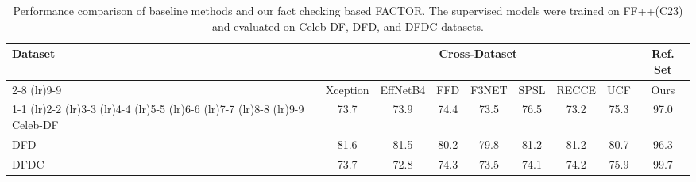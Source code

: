 \documentclass{article} \usepackage{iclr2024_conference,times}
\begin{document}
\begin{table}[t]
\caption{Performance comparison of baseline methods and our fact checking based FACTOR. The supervised models were trained on FF++(C23) and evaluated on Celeb-DF, DFD, and DFDC datasets.}
\vspace{-0.75em}
\label{tab:cross_vs_ref}
\begin{center}
\begin{tabular}{lccccccc|c}
\toprule
\multirow{3}{*}{Dataset} & \multicolumn{7}{c|}{Cross-Dataset} & Ref. Set \\
\cmidrule(lr){2-8} \cmidrule(lr){9-9}
& Xception & EffNetB4 & FFD & F3NET & SPSL & 
 RECCE & UCF &  Ours \\
\cmidrule(lr){1-1} \cmidrule(lr){2-2} \cmidrule(lr){3-3} \cmidrule(lr){4-4} \cmidrule(lr){5-5} \cmidrule(lr){6-6} \cmidrule(lr){7-7} \cmidrule(lr){8-8} \cmidrule(lr){9-9}
Celeb-DF & 73.7 & 73.9 & 74.4 & 73.5 & 76.5 & 73.2 & 75.3 & 97.0\\
DFD & 81.6 & 81.5 & 80.2 & 79.8 & 81.2 & 81.2 & 80.7 & 96.3 \\
DFDC & 73.7 & 72.8 & 74.3 & 73.5 & 74.1 & 74.2 & 75.9 & 99.7 \\
\bottomrule
\end{tabular}
\end{center}
\end{table}


\vspace{-2em}
\end{document}
